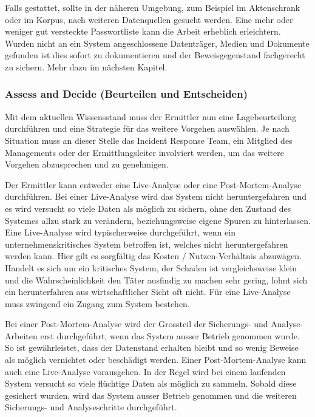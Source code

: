 Falls gestattet, sollte in der näheren Umgebung, zum Beispiel im Aktenschrank oder im Korpus, nach weiteren Datenquellen gesucht werden. Eine mehr oder weniger gut versteckte Passwortliste kann die Arbeit erheblich erleichtern. Wurden nicht an ein System angeschlossene Datenträger, Medien  und Dokumente gefunden ist dies sofort zu dokumentieren und der Beweisgegenstand fachgerecht zu sichern. Mehr dazu im nächsten Kapitel.

\subsubsection{Assess and Decide (Beurteilen und Entscheiden)}
Mit dem aktuellen Wissensstand muss der Ermittler nun eine Lagebeurteilung durchführen und eine Strategie für das weitere Vorgehen auswählen. Je nach Situation muss an dieser Stelle das Incident Response Team, ein Mitglied des Managements oder der Ermittlungsleiter involviert werden, um das weitere Vorgehen abzusprechen und zu genehmigen.

Der Ermittler kann entweder eine Live-Analyse oder eine Post-Mortem-Analyse durchführen. Bei einer Live-Analyse wird das System nicht heruntergefahren und es wird versucht so viele Daten als möglich zu sichern, ohne den Zustand des Systemes allzu stark zu verändern, beziehungsweise eigene Spuren zu hinterlassen. Eine Live-Analyse wird typischerweise durchgeführt, wenn ein unternehmenskritisches System betroffen ist, welches nicht heruntergefahren werden kann. Hier gilt es sorgfältig das Kosten / Nutzen-Verhältnis abzuwägen. Handelt es sich um ein kritisches System, der Schaden ist vergleichsweise klein und die Wahrscheinlichkeit den Täter ausfindig zu machen sehr gering, lohnt sich ein herunterfahren aus wirtschaftlicher Sicht oft nicht. Für eine Live-Analyse muss zwingend ein Zugang zum System bestehen.

Bei einer Post-Mortem-Analyse wird der Grossteil der Sicherungs- und Analyse-Arbeiten erst durchgeführt, wenn das System ausser Betrieb genommen wurde. So ist gewährleistet, dass der Datenstand erhalten bleibt und so wenig Beweise als möglich vernichtet oder beschädigt werden. Einer Post-Mortem-Analyse kann auch eine Live-Analyse vorausgehen. In der Regel wird bei einem laufenden System versucht so viele flüchtige Daten als möglich zu sammeln. Sobald diese gesichert wurden, wird das System ausser Betrieb genommen und die weiteren Sicherungs- und Analyseschritte durchgeführt.

